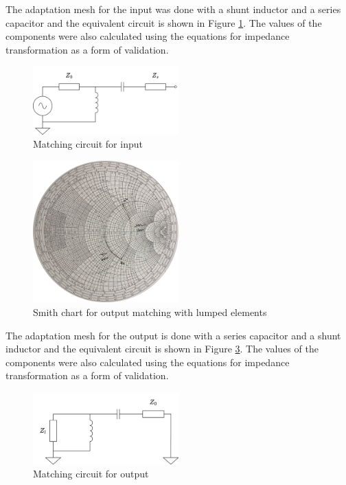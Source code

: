 The adaptation mesh for the input was done with a shunt inductor and a series capacitor and the equivalent circuit is shown in Figure \ref{fig:MatchingCircuit-input}. The values of the components were also calculated using the equations for impedance transformation as a form of validation.

\begin{figure}[H]
    \centering
    \includegraphics[width=0.5\textwidth]{Images/Input-matching-circuit.png}
    \caption{Matching circuit for input}
    \label{fig:MatchingCircuit-input}
\end{figure}

\begin{figure}[H]
    \centering
    \includegraphics[width=0.5\textwidth]{Images/zl-LC-matching.png}
    \caption{Smith chart for output matching with lumped elements}
    \label{fig:zl-LC-matching}
\end{figure}

The adaptation mesh for the output is done with a series capacitor and a shunt inductor and the equivalent circuit is shown in Figure \ref{fig:MatchingCircuit-output}. The values of the components were also calculated using the equations for impedance transformation as a form of validation.

\begin{figure}[H]
    \centering
    \includegraphics[width=0.5\textwidth]{Images/Ouput-matching-circuit.png}
    \caption{Matching circuit for output}
    \label{fig:MatchingCircuit-output} 
\end{figure}


